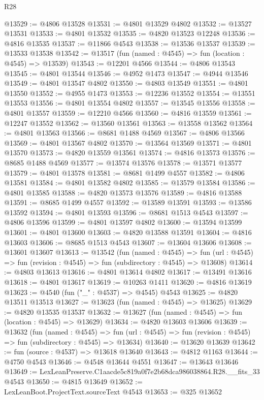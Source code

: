 \begin{lexlean}{R28}
\begin{coremodule}
@13529 := @4806 @13528
@13531 := @4801 @13529 @4802
@13532 := @13527 @13531
@13533 := @4801 @13532
@13535 := @4820 @13523 @12248
@13536 := @4816 @13535
@13537 := @11866 @4543
@13538 := @13536 @13537
@13539 := @13533 @13538
@13542 := @13517 (fun (named : @4545) => fun (location : @4545) => @13539)
@13543 := @12201 @4566
@13544 := @4806 @13543
@13545 := @4801 @13544
@13546 := @4952 @1473
@13547 := @4944 @13546
@13549 := @4801 @13547 @4802
@13550 := @4803 @13549
@13551 := @4801 @13550
@13552 := @4955 @1473
@13553 := @12236 @13552
@13554 := @13551 @13553
@13556 := @4801 @13554 @4802
@13557 := @13545 @13556
@13558 := @4801 @13557
@13559 := @12210 @4566
@13560 := @4816 @13559
@13561 := @12247 @13552
@13562 := @13560 @13561
@13563 := @13558 @13562
@13564 := @4801 @13563
@13566 := @8681 @1488 @4569
@13567 := @4806 @13566
@13569 := @4801 @13567 @4802
@13570 := @13564 @13569
@13571 := @4801 @13570
@13573 := @4820 @13559 @13561
@13574 := @4816 @13573
@13576 := @8685 @1488 @4569
@13577 := @13574 @13576
@13578 := @13571 @13577
@13579 := @4801 @13578
@13581 := @8681 @1499 @4557
@13582 := @4806 @13581
@13584 := @4801 @13582 @4802
@13585 := @13579 @13584
@13586 := @4801 @13585
@13588 := @4820 @13573 @13576
@13589 := @4816 @13588
@13591 := @8685 @1499 @4557
@13592 := @13589 @13591
@13593 := @13586 @13592
@13594 := @4801 @13593
@13596 := @8681 @1513 @4543
@13597 := @4806 @13596
@13599 := @4801 @13597 @4802
@13600 := @13594 @13599
@13601 := @4801 @13600
@13603 := @4820 @13588 @13591
@13604 := @4816 @13603
@13606 := @8685 @1513 @4543
@13607 := @13604 @13606
@13608 := @13601 @13607
@13613 := @13542
    (fun (named : @4545) =>
    fun (url : @4545) => fun (revision : @4545) => fun (subdirectory : @4545) => @13608)
@13614 := @4803 @13613
@13616 := @4801 @13614 @4802
@13617 := @13491 @13616
@13618 := @4801 @13617
@13619 := @10263 @1411
@13620 := @4816 @13619
@13623 := @4540 (fun ("_" : @4537) => @4545) @4543
@13625 := @4820 @13511 @13513
@13627 := @13623 (fun (named : @4545) => @13625)
@13629 := @4820 @13535 @13537
@13632 := @13627 (fun (named : @4545) => fun (location : @4545) => @13629)
@13634 := @4820 @13603 @13606
@13639 := @13632
    (fun (named : @4545) =>
    fun (url : @4545) => fun (revision : @4545) => fun (subdirectory : @4545) => @13634)
@13640 := @13620 @13639
@13642 := fun (source : @4537) => @13618 @13640
@13643 := @4812 @1163
@13644 := @4750 @4543
@13646 := @4548 @13644 @4551
@13647 := @13643 @13646
@13649 := LexLeanPreserve.C1aacde5c819a0f7e2b68dca986038864.R28.__fits_33 @4543
@13650 := @4815 @13649
@13652 := LexLeanBoot.ProjectText.sourceText @4543
@13653 := @325 @13652

\end{coremodule}
\end{lexlean}
